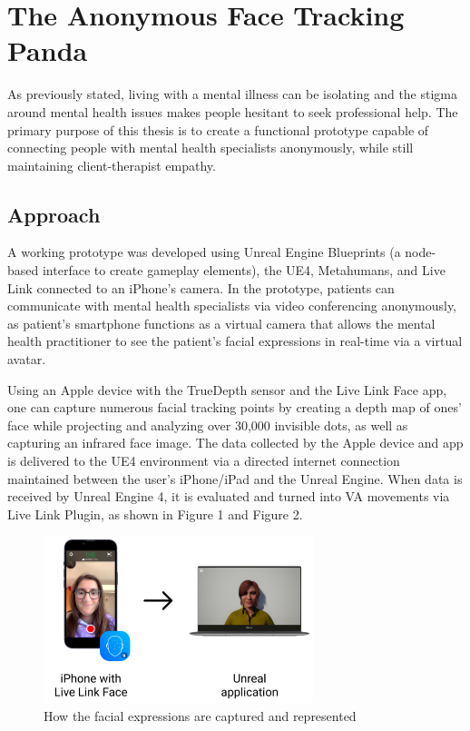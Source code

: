 \section{The Anonymous Face Tracking Panda}
As previously stated, living with a mental illness can be isolating and the stigma around mental health issues makes people hesitant to seek professional help. The primary purpose of this thesis is to create a functional prototype capable of connecting people with mental health specialists anonymously, while still maintaining client-therapist empathy.

\subsection{Approach}
A working prototype was developed using Unreal Engine Blueprints (a node-based interface to create gameplay elements), the UE4, Metahumans, and Live Link connected to an iPhone's camera. In the prototype, patients can communicate with mental health specialists via video conferencing anonymously, as patient's smartphone functions as a virtual camera that allows the mental health practitioner to see the patient's facial expressions in real-time via a virtual avatar.

Using an Apple device with the TrueDepth sensor and the Live Link Face app, one can capture numerous facial tracking points by creating a depth map of ones’ face while projecting and analyzing over 30,000 invisible dots, as well as capturing an infrared face image. The data collected by the Apple device and app is delivered to the UE4 environment via a directed internet connection maintained between the user's iPhone/iPad and the Unreal Engine. When data is received by Unreal Engine 4, it is evaluated and turned into VA movements via Live Link Plugin, as shown in Figure 1 and Figure 2.

\begin{figure}[h!]
\includegraphics[width=0.7\textwidth]{figures/howItWorks.png}
\centering
\caption{How the facial expressions are captured and represented}
\end{figure}

